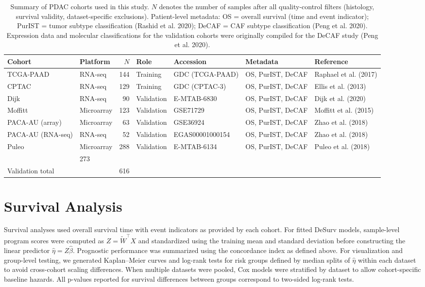 \documentclass[
]{article}
\begin{document}
\begin{table}[ht]
\centering
\caption{Summary of PDAC cohorts used in this study. $N$ denotes the number of
samples after all quality-control filters (histology, survival validity,
dataset-specific exclusions). Patient-level metadata: OS = overall survival
(time and event indicator); PurIST = tumor subtype classification
(Rashid et al. 2020); DeCAF = CAF subtype classification
(Peng et al. 2020). Expression data and molecular classifications
for the validation cohorts were originally compiled for the DeCAF study
(Peng et al. 2020).}
\label{tab:cohorts}
\footnotesize
\begin{tabular}{llrllll}
\toprule
Cohort & Platform & $N$ & Role & Accession & Metadata & Reference \\
\midrule
TCGA-PAAD        & RNA-seq    & 144 & Training   & GDC (TCGA-PAAD) & OS, PurIST, DeCAF & Raphael et al. (2017) \\
CPTAC            & RNA-seq    & 129 & Training   & GDC (CPTAC-3)    & OS, PurIST, DeCAF & Ellis et al. (2013) \\
\addlinespace
Dijk             & RNA-seq    &  90 & Validation & E-MTAB-6830      & OS, PurIST, DeCAF & Dijk et al. (2020) \\
Moffitt          & Microarray & 123 & Validation & GSE71729         & OS, PurIST, DeCAF & Moffitt et al. (2015) \\
PACA-AU (array)  & Microarray &  63 & Validation & GSE36924         & OS, PurIST, DeCAF & Zhao et al. (2018) \\
PACA-AU (RNA-seq) & RNA-seq   &  52 & Validation & EGAS00001000154  & OS, PurIST, DeCAF & Zhao et al. (2018) \\
Puleo            & Microarray & 288 & Validation & E-MTAB-6134      & OS, PurIST, DeCAF & Puleo et al. (2018) \\
\addlinespace
\multicolumn{2}{l}{Training total} & 273 & & & & \\
\multicolumn{2}{l}{Validation total} & 616 & & & & \\
\bottomrule
\end{tabular}
\end{table}

\section{Survival Analysis}

Survival analyses used overall survival time with event indicators as
provided by each cohort. For fitted DeSurv models, sample-level program
scores were computed as \(Z = \tilde{W}^\top X\) and standardized using
the training mean and standard deviation before constructing the linear
predictor \(\hat{\eta} = Z \hat{\beta}\). Prognostic performance was
summarized using the concordance index as defined above. For
visualization and group-level testing, we generated Kaplan--Meier curves
and log-rank tests for risk groups defined by median splits of
\(\hat{\eta}\) within each dataset to avoid cross-cohort scaling
differences. When multiple datasets were pooled, Cox models were
stratified by dataset to allow cohort-specific baseline hazards. All
p-values reported for survival differences between groups correspond to
two-sided log-rank tests.
\end{document}
